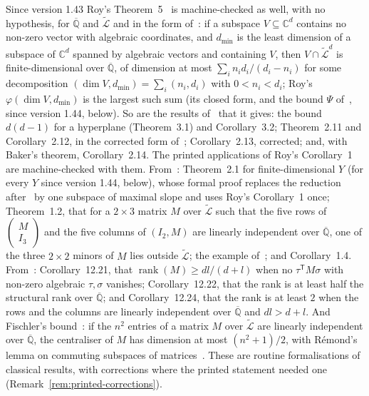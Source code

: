 \documentclass[11pt,a4paper]{article}
\theoremstyle{plain}
\theoremstyle{definition}
\newcommand{\C}{\mathbb{C}}
\newcommand{\Alg}{\overline{\mathbb{Q}}}
\newcommand{\aLogs}{\widetilde{\mathcal{L}}}
\begin{document}
Since version 1.43 Roy's Theorem~5~\cite[Theorem~5]{roy-1992} is machine-checked as well, with no hypothesis,
for $\Alg$ and $\aLogs$ and in the form of~\cite[Corollary~11.15]{waldschmidt-book}: if a subspace $V\subseteq\C^{d}$
contains no non-zero vector with algebraic coordinates, and $d_{\min}$ is the least dimension of a subspace of
$\C^{d}$ spanned by algebraic vectors and containing $V$, then $V\cap\aLogs^{d}$ is finite-dimensional over $\Alg$,
of dimension at most $\sum_{i}n_{i}d_{i}/(d_{i}-n_{i})$ for some decomposition
$(\dim V,d_{\min})=\sum_{i}(n_{i},d_{i})$ with $0<n_{i}<d_{i}$; Roy's $\varphi(\dim V,d_{\min})$ is the largest such
sum (its closed form, and the bound $\Psi$ of~\cite[Corollary~11.15]{waldschmidt-book}, since version 1.44, below).
So are the results of~\cite{waldschmidt-2005a} that it gives: the bound $d(d-1)$ for a hyperplane
(Theorem~3.1) and Corollary~3.2; Theorem~2.11 and Corollary~2.12, in the corrected form
of~\cite[Corollary~6.3]{waldschmidt-role}; Corollary~2.13, corrected; and, with Baker's theorem, Corollary~2.14.
The printed applications of Roy's Corollary~1 are machine-checked with them. From~\cite{waldschmidt-2005b}:
Theorem~2.1 for finite-dimensional $Y$ (for every $Y$ since version 1.44, below), whose formal proof replaces the
reduction after~\cite[Lemmes~5.1
and~5.2]{waldschmidt-1981} by one subspace of maximal slope and uses Roy's Corollary~1 once; Theorem~1.2, that
for a $2\times3$ matrix $M$ over $\aLogs$ such that the five rows of
$\left(\begin{smallmatrix}M\\ I_{3}\end{smallmatrix}\right)$ and the five columns of $(I_{2},M)$ are linearly
independent over $\Alg$, one of the three $2\times2$ minors of $M$ lies outside $\aLogs$; the example
of~\cite[p.~3]{waldschmidt-2005b}; and Corollary~1.4. From~\cite[\S12.3]{waldschmidt-book}: Corollary~12.21, that
$\operatorname{rank}(M)\geq dl/(d+l)$ when no $\tau^{\mathsf{T}}M\sigma$ with non-zero algebraic $\tau,\sigma$
vanishes; Corollary~12.22, that the rank is at least half the structural rank over $\Alg$; and Corollary~12.24,
that the rank is at least $2$ when the rows and the columns are linearly independent over $\Alg$ and $dl>d+l$.
And Fischler's bound~\cite[Theorem~1.2]{fischler-2001}: if the $n^{2}$ entries of a matrix $M$ over $\aLogs$ are
linearly independent over $\Alg$, the centraliser of $M$ has dimension at most $(n^{2}+1)/2$, with R\'emond's lemma
on commuting subspaces of matrices~\cite[Lemma~5.6]{fischler-2001}. These are routine formalisations of classical
results, with corrections where the printed statement needed one (Remark~\ref{rem:printed-corrections}).
\end{document}
